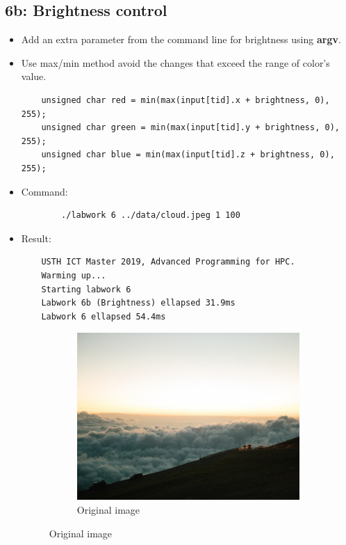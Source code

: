 \documentclass{article}
\begin{document}
\subsection{6b: Brightness control}
\begin{itemize}
    \item Add an extra parameter from the command line for brightness using \textbf{argv}.
    \item Use max/min method avoid the changes that exceed the range of color's value.
    \begin{verbatim}
    unsigned char red = min(max(input[tid].x + brightness, 0), 255);
    unsigned char green = min(max(input[tid].y + brightness, 0), 255);
    unsigned char blue = min(max(input[tid].z + brightness, 0), 255);
    \end{verbatim}
    \item Command:
    \begin{verbatim}
        ./labwork 6 ../data/cloud.jpeg 1 100
    \end{verbatim}
    \item Result:
    \begin{verbatim}
    USTH ICT Master 2019, Advanced Programming for HPC.
    Warming up...
    Starting labwork 6
    Labwork 6b (Brightness) ellapsed 31.9ms
    Labwork 6 ellapsed 54.4ms
    \end{verbatim}
    \begin{figure}[h]
      \centering
      \begin{subfigure}{.45\textwidth}
        \includegraphics[width=\linewidth]{./result/cloud.jpeg}
        \caption{Original image}

\end{subfigure}
\end{figure}
\end{itemize}
\end{document}
